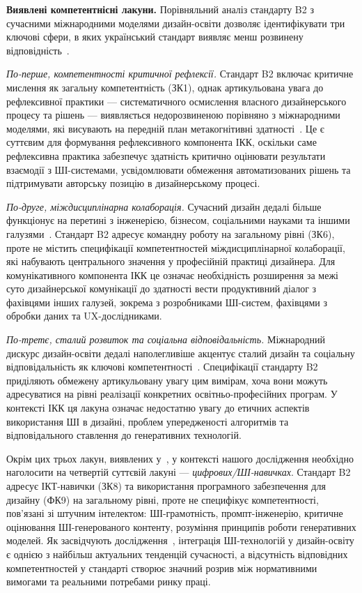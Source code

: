 \textbf{Виявлені компетентнісні лакуни.} Порівняльний аналіз стандарту B2 з сучасними міжнародними моделями дизайн-освіти дозволяє ідентифікувати три ключові сфери, в яких український стандарт виявляє менш розвинену відповідність~\cite{Musiienko2025DesignEducation}.

\emph{По-перше, компетентності критичної рефлексії.} Стандарт B2 включає критичне мислення як загальну компетентність (ЗК1), однак артикульована увага до рефлексивної практики --- систематичного осмислення власного дизайнерського процесу та рішень --- виявляється недорозвиненою порівняно з міжнародними моделями, які висувають на передній план метакогнітивні здатності~\cite{Schon1983, Hameed2023310}. Це є суттєвим для формування рефлексивного компонента ІКК, оскільки саме рефлексивна практика забезпечує здатність критично оцінювати результати взаємодії з ШІ-системами, усвідомлювати обмеження автоматизованих рішень та підтримувати авторську позицію в дизайнерському процесі.

\emph{По-друге, міждисциплінарна колаборація.} Сучасний дизайн дедалі більше функціонує на перетині з інженерією, бізнесом, соціальними науками та іншими галузями~\cite{Davis202397}. Стандарт B2 адресує командну роботу на загальному рівні (ЗК6), проте не містить специфікації компетентностей міждисциплінарної колаборації, які набувають центрального значення у професійній практиці дизайнера. Для комунікативного компонента ІКК це означає необхідність розширення за межі суто дизайнерської комунікації до здатності вести продуктивний діалог з фахівцями інших галузей, зокрема з розробниками ШІ-систем, фахівцями з обробки даних та UX-дослідниками.

\emph{По-третє, сталий розвиток та соціальна відповідальність.} Міжнародний дискурс дизайн-освіти дедалі наполегливіше акцентує сталий дизайн та соціальну відповідальність як ключові компетентності~\cite{Maia2022105}. Специфікації стандарту B2 приділяють обмежену артикульовану увагу цим вимірам, хоча вони можуть адресуватися на рівні реалізації конкретних освітньо-професійних програм. У контексті ІКК ця лакуна означає недостатню увагу до етичних аспектів використання ШІ в дизайні, проблем упередженості алгоритмів та відповідального ставлення до генеративних технологій.

Окрім цих трьох лакун, виявлених у~\cite{Musiienko2025DesignEducation}, у контексті нашого дослідження необхідно наголосити на четвертій суттєвій лакуні --- \emph{цифрових/ШІ-навичках}. Стандарт B2 адресує ІКТ-навички (ЗК8) та використання програмного забезпечення для дизайну (ФК9) на загальному рівні, проте не специфікує компетентності, пов'язані зі штучним інтелектом: ШІ-грамотність, промпт-інженерію, критичне оцінювання ШІ-генерованого контенту, розуміння принципів роботи генеративних моделей. Як засвідчують дослідження~\cite{Song2025401, Hwang2025239, Chen2025}, інтеграція ШІ-технологій у дизайн-освіту є однією з найбільш актуальних тенденцій сучасності, а відсутність відповідних компетентностей у стандарті створює значний розрив між нормативними вимогами та реальними потребами ринку праці.

